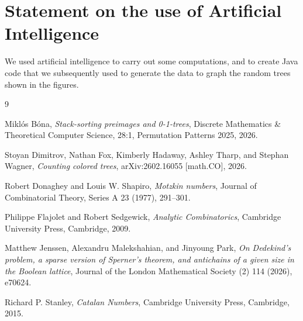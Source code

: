 \documentclass[10pt,a4paper]{amsart}
\theoremstyle{remark}
\begin{document}
\section*{Statement on the use of Artificial Intelligence}
We used artificial intelligence to carry out some computations, and to create Java code that we subsequently used to generate the data to graph the random trees shown in the figures.



\begin{thebibliography}{9}

Mikl\'os B\'ona,
\emph{Stack-sorting preimages and 0-1-trees},
Discrete Mathematics \& Theoretical Computer Science, 28:1, Permutation Patterns 2025, 2026.

Stoyan Dimitrov, Nathan Fox, Kimberly Hadaway, Ashley Tharp, and Stephan Wagner,
\emph{Counting colored trees},
arXiv:2602.16055 [math.CO], 2026.

Robert Donaghey and Louis W. Shapiro,
\emph{Motzkin numbers},
Journal of Combinatorial Theory, Series A 23 (1977), 291--301.

Philippe Flajolet and Robert Sedgewick,
\emph{Analytic Combinatorics},
Cambridge University Press, Cambridge, 2009.

Matthew Jenssen, Alexandru Malekshahian, and Jinyoung Park,
\emph{On Dedekind's problem, a sparse version of Sperner's theorem, and antichains of a given size in the Boolean lattice},
Journal of the London Mathematical Society (2) 114 (2026), e70624.

Richard P. Stanley,
\emph{Catalan Numbers},
Cambridge University Press, Cambridge, 2015.

\end{thebibliography}
\end{document}
